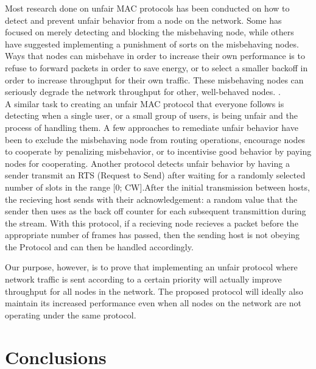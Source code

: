 \documentclass{sigcomm-alternate}
\begin{document}
Most research done on unfair MAC protocols has been conducted on how to detect and prevent unfair behavior from a node on the network. Some has focused on merely detecting and blocking the misbehaving node, while others have suggested implementing a punishment of sorts on the misbehaving nodes. Ways that nodes can misbehave in order to increase their own performance is to refuse to forward packets in order to save energy, or to select a smaller backoff in order to increase throughput for their own traffic. These misbehaving nodes can seriously degrade the network throughput for other, well-behaved nodes. \cite{Kyasanur}.   \\

A similar task to creating an unfair MAC protocol that everyone follows is detecting when a single user, or a small group of users, is being unfair and the process of handling them. A few approaches to remediate unfair behavior have been to exclude the misbehaving node from routing operations, encourage nodes to cooperate by penalizing misbehavior, or to incentivise good behavior by paying nodes for cooperating. Another protocol detects unfair behavior by having a sender transmit an RTS (Request to Send) after waiting for a randomly selected number of slots in the range [0; CW].After the initial transmission between hosts, the recieving host sends with their acknowledgement: a random value that the sender then uses as the back off counter for each subsequent transmittion during the stream. \cite{Kyasanur} With this protocol, if a recieving node recieves a packet before the appropriate number of frames has passed, then the sending host is not obeying the Protocol and can then be handled accordingly.

Our purpose, however, is to prove that implementing an unfair protocol where network traffic is sent according to a certain priority will actually improve throughput for all nodes in the network. The proposed protocol will ideally also maintain its increased performance even when all nodes on the network are not operating under the same protocol. 

\section{Conclusions}
\label{section:conclusions}



\balancecolumns
\end{document}
